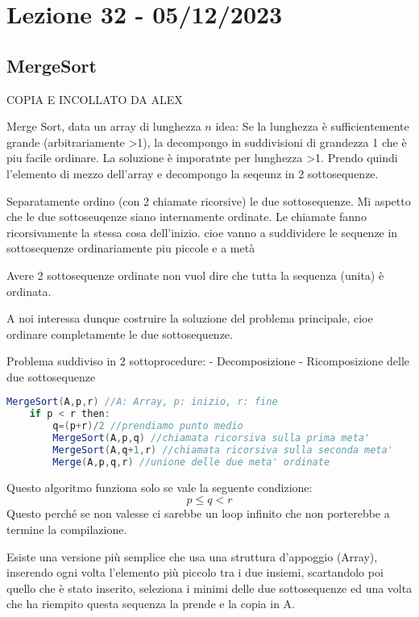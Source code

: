 \section{Lezione 32 - 05/12/2023}

\subsection{MergeSort}
COPIA E INCOLLATO DA ALEX 

Merge Sort, data un array di lunghezza $n$
idea: Se la lunghezza è sufficientemente grande (arbitrariamente >1), la decompongo in suddivisioni di grandezza 1 che è piu facile ordinare. La soluzione è imporatnte per lunghezza >1.
Prendo quindi l'elemento di mezzo dell'array e decompongo la seqeunz in 2 sottosequenze.

Separatamente ordino (con 2 chiamate ricorsive) le due sottosequenze.
Mi aspetto che le due sottoseuqenze siano internamente ordinate.
Le chiamate fanno ricorsivamente la stessa cosa dell'inizio. cioe vanno a suddividere le sequenze in sottosequenze ordinariamente piu piccole e a metà


Avere 2 sottosequenze ordinate non vuol dire che tutta la sequenza (unita) è ordinata.

A noi interessa dunque costruire la soluzione del problema principale, cioe ordinare completamente le due sottosequenze.

Problema suddiviso in 2 sottoprocedure:
- Decomposizione
- Ricomposizione delle due sottosequenze

\begin{lstlisting}[language=Java]
MergeSort(A,p,r) //A: Array, p: inizio, r: fine
    if p < r then:
        q=(p+r)/2 //prendiamo punto medio
        MergeSort(A,p,q) //chiamata ricorsiva sulla prima meta'
        MergeSort(A,q+1,r) //chiamata ricorsiva sulla seconda meta'
        Merge(A,p,q,r) //unione delle due meta' ordinate
\end{lstlisting}
Questo algoritmo funziona solo se vale la seguente condizione:
$$p \le q < r$$
Questo perché se non valesse ci sarebbe un loop infinito che non porterebbe a termine la compilazione.\bigskip

Esiste una versione più semplice che usa una struttura d'appoggio (Array), inserendo ogni volta l'elemento più piccolo tra i due insiemi, scartandolo poi quello che è stato inserito, seleziona i minimi delle due sottosequenze ed una volta che ha riempito questa sequenza la prende e la copia in A.\bigskip

